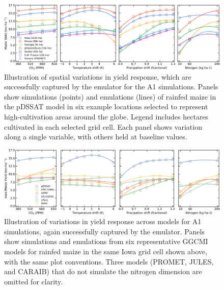\documentclass[12pt]{article}
\begin{document}
\begin{figure}[h!]
\centering
    \includegraphics[width=16.3cm]{regression_exampleA1.png}
    \caption{
    Illustration of spatial variations in yield response, which are successfully captured by the emulator for the A1 simulations. 
    Panels show simulations (points) and emulations (lines) of rainfed maize in the pDSSAT model in six example locations selected to represent high-cultivation areas around the globe. 
    Legend includes hectares cultivated in each selected grid cell. 
    Each panel shows variation along a single variable, with others held at baseline values. 
    }
   \label{fig:regression}
\end{figure}

\begin{figure}[h!]
\centering
    \includegraphics[width=16.3cm]{regression_exampleA1_2.png}
    \caption{
    Illustration of variations in yield response across models for A1 simulations, again successfully captured by the emulator. 
    Panels show simulations and emulations from six representative GGCMI models for rainfed maize in the same Iowa grid cell shown above, with the same plot conventions. 
    Three models (PROMET, JULES, and CARAIB) that do not simulate the nitrogen dimension are omitted for clarity. 
    }
   \label{fig:regression_2}
\end{figure}


\clearpage
\end{document}

